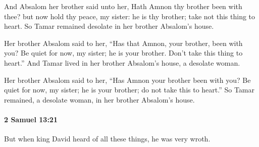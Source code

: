 			\begin{versebox}
					\item[BHS] 
					\item[ASV] And Absalom her brother said unto her, Hath Amnon thy brother been with thee? but now hold thy peace, my sister: he is thy brother; take not this thing to heart. So Tamar remained desolate in her brother Absalom's house.
					\item[NIV] Her brother Absalom said to her, “Has that Amnon, your brother, been with you? Be quiet for now, my sister; he is your brother. Don’t take this thing to heart.” And Tamar lived in her brother Absalom’s house, a desolate woman.
					\item[NRSV] Her brother Absalom said to her, “Has Amnon your brother been with you? Be quiet for now, my sister; he is your brother; do not take this to heart.” So Tamar remained, a desolate woman, in her brother Absalom’s house.
			\end{versebox}

		\paragraph{2 Samuel 13:21} %
			\label{2SAMUEL-13-21}

			But when king David heard of all these things, he was very wroth.

